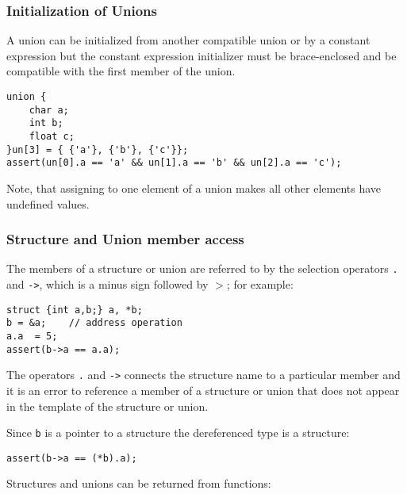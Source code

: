 \subsubsection{Initialization of Unions}
\label{sec:InitUnion}

A union can be initialized from another compatible union or by a
constant expression but the constant expression initializer must be
brace-enclosed and be compatible with the first member of the union.
\begin{production}
\begin{verbatim}
union {
    char a;
    int b;
    float c;
}un[3] = { {'a'}, {'b'}, {'c'}};
assert(un[0].a == 'a' && un[1].a == 'b' && un[2].a == 'c');
\end{verbatim}
\end{production}

Note, that assigning to one element of a union makes all other
elements have undefined values.


\subsubsection{Structure and Union member access}

The members of a structure or union are referred to by the selection
operators {\tt .} and \verb+->+, which is a minus sign followed by
$>$; for example:

\begin{production}
\begin{verbatim}
struct {int a,b;} a, *b;
b = &a;    // address operation
a.a  = 5; 
assert(b->a == a.a);
\end{verbatim}
\end{production}

The operators {\tt .} and \verb+->+ connects the structure name to a
particular member and it is an error to reference a member
of a structure or union that does not appear in the template of the
structure or union.

Since {\tt b} is a pointer to a structure the dereferenced type is
a structure:
\begin{production}
\begin{verbatim}
assert(b->a == (*b).a);
\end{verbatim}
\end{production}

Structures and unions can be returned from functions:

